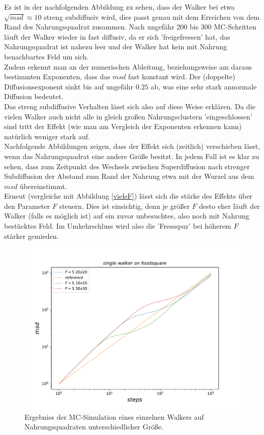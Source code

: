 \documentclass[a4paper, 12pt]{report}
\begin{document}
\noindent Es ist in der nachfolgenden Abbildung zu sehen, dass der Walker bei etwa $\sqrt{msd} \approx 10$ streng subdiffusiv wird, dies passt genau mit dem Erreichen von dem Rand des Nahrungsquadrat zusammen. Nach ungefähr 200 bis 300 MC-Schritten läuft der Walker wieder in fast diffusiv, da er sich 'freigefressen' hat, das Nahrungsquadrat ist nahezu leer und der Walker hat kein mit Nahrung benachbartes Feld um sich. 
\\
\noindent Zudem erkennt man an der numerischen Ableitung, beziehungsweise am daraus bestimmten Exponenten, dass das $msd$ fast konstant wird. Der (doppelte) Diffusionsexponent sinkt bis auf ungefähr $0.25$ ab, was eine sehr stark annormale Diffusion bedeutet.
\\
\noindent Das streng subdiffusive Verhalten lässt sich also auf diese Weise erklären. Da die vielen Walker auch nicht alle in gleich großen Nahrungsclustern 'eingeschlossen' sind tritt der Effekt (wie man am Vergleich der Exponenten erkennen kann) natürlich weniger stark auf.
\\
\noindent Nachfolgende Abbildungen zeigen, dass der Effekt sich (zeitlich) verschieben lässt, wenn das Nahrungsquadrat eine andere Größe besitzt. In jedem Fall ist es klar zu sehen, dass zum Zeitpunkt des Wechsels zwischen Superdiffusion nach strenger Subdiffusion der Abstand zum Rand der Nahrung etwa mit der Wurzel aus dem $msd$ übereinstimmt.
\\
\noindent Erneut (vergleiche mit Abbildung \ref{vieleF}) lässt sich die stärke des Effekts über den Parameter $F$ steuern. Dies ist einsichtig, denn je größer $F$ desto eher läuft der Walker (falls es möglich ist) auf ein zuvor unbesuchtes, also noch mit Nahrung bestücktes Feld. Im Umkehrschluss wird also die 'Fressspur' bei höherem $F$ stärker gemieden.

\begin{figure}[H]
	\centering
	\includegraphics[scale=0.8]{abc.pdf}
	\caption{Ergebniss der MC-Simulation eines einzelnen Walkers auf Nahrungsquadraten unterschiedlicher Größe.}
\end{figure}
\end{document}
